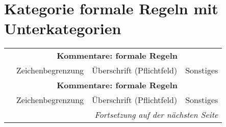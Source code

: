 \section{Kategorie formale Regeln mit Unterkategorien}
\begin{landscape} \footnotesize
  \begin{longtable}{l|llp{100mm}}

  & \multicolumn{3}{c}{\bfseries Kommentare: formale Regeln} \\
  & Zeichenbegrenzung & Überschrift (Pflichtfeld) & Sonstiges \\\hline
  \endfirsthead

  & \multicolumn{3}{c}{\bfseries Kommentare: formale Regeln} \\
  & Zeichenbegrenzung & Überschrift (Pflichtfeld) & Sonstiges \\\hline
  \endhead

  \hline \multicolumn{4}{r}{\emph{Fortsetzung auf der nächsten Seite}}
  \endfoot

  \hline
  \endlastfoot


\end{longtable}
\end{landscape}
